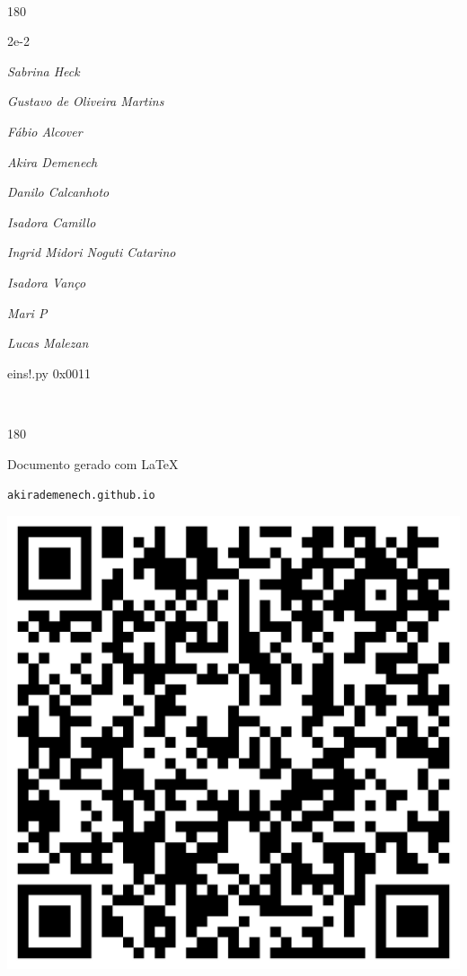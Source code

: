 \documentclass[12pt]{article}
\begin{document}
\pagebreak			

	\ 
	\vfill
	\begin{turn}{180}	
		\begin{minipage}{\textwidth}
		  	\ttfamily %
			\centering
			{\Huge 2e-2}
		  
			\hfill
		  
			

\textit{\small Sabrina Heck}

\textit{\small Gustavo de Oliveira Martins}

\textit{\small Fábio Alcover}

\textit{\small Akira Demenech}

\textit{\small Danilo Calcanhoto}

\textit{\small Isadora Camillo}

\textit{\small Ingrid Midori Noguti Catarino}

\textit{\small Isadora Vanço}

\textit{\small Mari P}

\textit{\small Lucas Malezan}

\bigskip

eins!.py
0x0011


		\end{minipage}	
	\end{turn}
	\vfill
	\

\pagebreak

	\begin{turn}{180}	
		\begin{minipage}{\textwidth}		  
		  Documento gerado com \LaTeX			
		  
		  \texttt{akirademenech.github.io}

		  \includegraphics[height=0.3\textheight]{2e-2.pdf}

		\end{minipage}	
	\end{turn}  
		  
\end{document}
